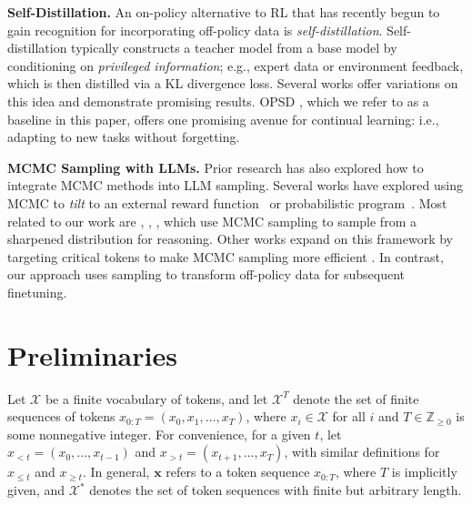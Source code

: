 \documentclass{article}
\renewcommand{\paragraph}[1]{\vspace{.1em}\noindent\textbf{#1}}
\begin{document}
\paragraph{Self-Distillation.} An on-policy alternative to RL that has recently begun to gain recognition for incorporating off-policy data is \textit{self-distillation}. Self-distillation typically constructs a teacher model from a base model by conditioning on \textit{privileged information}; e.g., expert data or environment feedback, which is then distilled via a KL divergence loss. Several works \citep{shenfeld2026self, ye2026onpolicycontext, zhao2026selfdistilledreasoner} offer variations on this idea and demonstrate promising results. OPSD \citep{shenfeld2026self, zhao2026selfdistilledreasoner}, which we refer to as a baseline in this paper, offers one promising avenue for continual learning: i.e., adapting to new tasks without forgetting. 

\paragraph{MCMC Sampling with LLMs.} Prior research has also explored how to integrate MCMC methods into LLM sampling. Several works have explored using MCMC to {\it tilt} to an external reward function~\citep{zhao2024probabilisticinference, faria2024quest} or probabilistic program~\citep{lew2023sequential}. Most related to our work are \cite{karan2025reasoning}, \cite{azizi2026powersmc}, \cite{arzhantsev2026self},\nocite{karan2024unrolled} which use MCMC sampling to sample from a sharpened distribution for reasoning.  Other works expand on this framework by targeting critical tokens \citep{li2025blinkofaneyetheory}\nocite{karan2025reguidance} to make MCMC sampling more efficient \citep{zhou2026reasoning, ji2026scalable}\nocite{gollakota2025predictor}. In contrast, our approach uses sampling to transform off-policy data for subsequent finetuning.

\vspace{-5pt}
\section{Preliminaries}
\vspace{-3pt}

Let $\mathcal{X}$ be a finite vocabulary of tokens, and let $\mathcal{X}^T$ denote the set of finite sequences of tokens $x_{0:T} = (x_0, x_1, \dots, x_T)$, where $x_i \in \mathcal{X}$ for all $i$ and $T \in \mathbb{Z}_{\geq 0}$ is some nonnegative integer. For convenience, for a given $t$, let $x_{<t} = (x_0, \dots, x_{t-1})$ and $x_{>t} = (x_{t+1}, \dots, x_{T})$, with similar definitions for $x_{\leq t}$ and $x_{\geq t}$. In general, $\mathbf{x}$ refers to a token sequence $x_{0:T}$, where $T$ is implicitly given, and $\mathcal{X}^*$ denotes the set of token sequences with finite but arbitrary length. 
\end{document}
